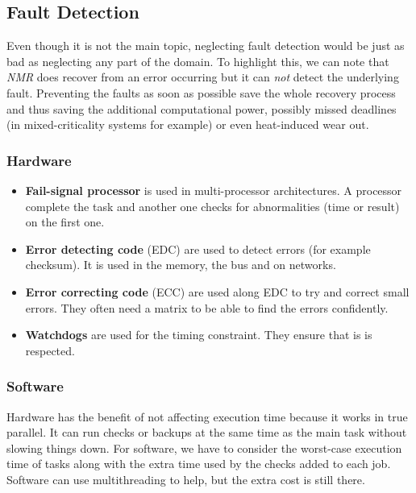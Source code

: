 \documentclass[11pt,a4paper]{report}
\begin{document}
\subsection{Fault Detection}
Even though it is not the main topic, neglecting fault detection would be just as bad as neglecting any part of the domain. 
To highlight this, we can note that \textit{NMR} does recover from an error occurring but it can \textit{not} detect the underlying fault. 
Preventing the faults as soon as possible save the whole recovery process and thus saving the additional computational power, possibly missed deadlines (in mixed-criticality systems for example) or even heat-induced wear out. 
\subsubsection{Hardware}
\begin{itemize}
    \item \textbf{Fail-signal processor} is used in multi-processor architectures. 
    A processor complete the task and another one checks for abnormalities (time or result) on the first one.
    \item \textbf{Error detecting code} (EDC) are used to detect errors (for example checksum). 
    It is used in the memory, the bus and on networks.
    \item \textbf{Error correcting code} (ECC) are used along EDC to try and correct small errors. 
    They often need a matrix to be able to find the errors confidently. 
    \item \textbf{Watchdogs} are used for the timing constraint. They ensure that is is respected.
\end{itemize}
\subsubsection{Software}

Hardware has the benefit of not affecting execution time because it works in true parallel. 
It can run checks or backups at the same time as the main task without slowing things down.
For software, we have to consider the worst-case execution time of tasks along with the extra time used by the checks added to each job. 
Software can use multithreading to help, but the extra cost is still there.
\end{document}
